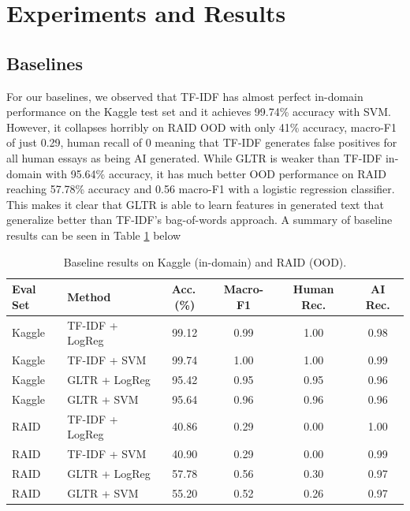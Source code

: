 \documentclass{article}
\begin{document}
\section{Experiments and Results}

\subsection{Baselines}
For our baselines, we observed that TF-IDF has almost perfect in-domain performance on the Kaggle test set and it achieves 99.74\% accuracy with SVM. However, it collapses horribly on RAID OOD with only 41\% accuracy, macro-F1 of just 0.29, human recall of 0 meaning that TF-IDF generates false positives for all human essays as being AI generated. While GLTR is weaker than TF-IDF in-domain with 95.64\% accuracy, it has much better OOD performance on RAID reaching 57.78\% accuracy and 0.56 macro-F1 with a logistic regression classifier. This makes it clear that GLTR is able to learn features in generated text that generalize better than TF-IDF's bag-of-words approach. A summary of baseline results can be seen in Table \ref{tab:baselines} below
\begin{table}[H]
    \centering
    \caption{Baseline results on Kaggle (in-domain) and RAID (OOD).}
    \label{tab:baselines}
    \footnotesize
    \begin{tabular}{@{}llcccc@{}}
        \toprule
        Eval Set & Method          & Acc.\,(\%) & Macro-F1 & Human Rec. & AI Rec. \\
        \midrule
        Kaggle   & TF-IDF + LogReg & 99.12      & 0.99     & 1.00       & 0.98    \\
        Kaggle   & TF-IDF + SVM    & 99.74      & 1.00     & 1.00       & 0.99    \\
        Kaggle   & GLTR + LogReg   & 95.42      & 0.95     & 0.95       & 0.96    \\
        Kaggle   & GLTR + SVM      & 95.64      & 0.96     & 0.96       & 0.96    \\
        \midrule
        RAID     & TF-IDF + LogReg & 40.86      & 0.29     & 0.00       & 1.00    \\
        RAID     & TF-IDF + SVM    & 40.90      & 0.29     & 0.00       & 0.99    \\
        RAID     & GLTR + LogReg   & 57.78      & 0.56     & 0.30       & 0.97    \\
        RAID     & GLTR + SVM      & 55.20      & 0.52     & 0.26       & 0.97    \\
        \bottomrule
    \end{tabular}
\end{table}
\end{document}
